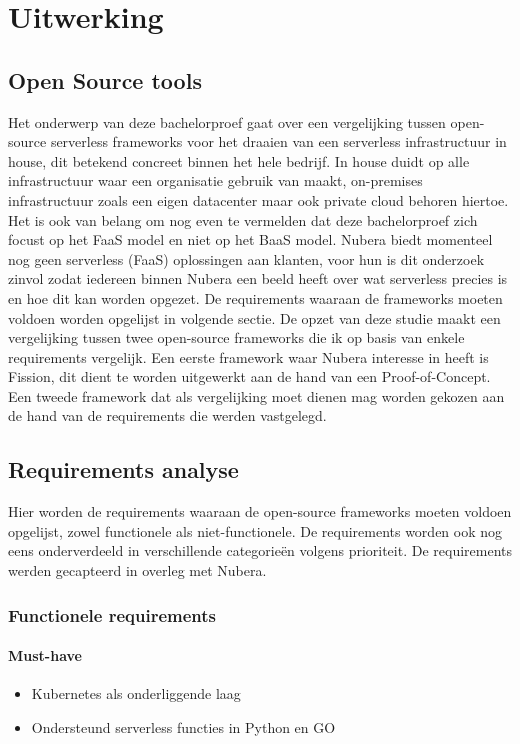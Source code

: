\chapter{Uitwerking}
\label{ch:uitwerking}
\section{Open Source tools}
Het onderwerp van deze bachelorproef gaat over een vergelijking tussen open-source serverless frameworks voor het draaien van een serverless infrastructuur in house, dit betekend concreet binnen het hele bedrijf. In house duidt op alle infrastructuur waar een organisatie gebruik van maakt, on-premises infrastructuur zoals een eigen datacenter maar ook private cloud behoren hiertoe. Het is ook van belang om nog even te vermelden dat deze bachelorproef zich focust op het FaaS model en niet op het BaaS model. Nubera biedt momenteel nog geen serverless (FaaS) oplossingen aan klanten, voor hun is dit onderzoek zinvol zodat iedereen binnen Nubera een beeld heeft over wat serverless precies is en hoe dit kan worden opgezet. De requirements waaraan de frameworks moeten voldoen worden opgelijst in volgende sectie. De opzet van deze studie maakt een vergelijking tussen twee open-source frameworks die ik op basis van enkele requirements vergelijk. Een eerste framework waar Nubera interesse in heeft is Fission, dit dient te worden uitgewerkt aan de hand van een Proof-of-Concept. Een tweede framework dat als vergelijking moet dienen mag worden gekozen aan de hand van de requirements die werden vastgelegd.

\section{Requirements analyse}
Hier worden de requirements waaraan de open-source frameworks moeten voldoen opgelijst, zowel functionele als niet-functionele. De requirements worden ook nog eens onderverdeeld in verschillende categorieën volgens prioriteit. De requirements werden gecapteerd in overleg met Nubera.

\subsection{Functionele requirements}
\subsubsection{Must-have}
\begin{itemize}
    \item Kubernetes als onderliggende laag
    \item Ondersteund serverless functies in Python en GO
\end{itemize}
